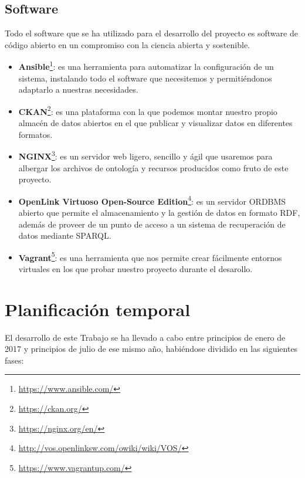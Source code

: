 \subsection{Software}

Todo el software que se ha utilizado para el desarrollo del proyecto es software de código abierto en un compromiso con la ciencia abierta y sostenible.

\begin{itemize}
	\item \textbf{Ansible}\footnote{\url {https://www.ansible.com/}}: es una herramienta para automatizar la configuración de un sistema, instalando todo el software que necesitemos y permitiéndonos adaptarlo a nuestras necesidades.
	\item \textbf{CKAN}\footnote{\url {https://ckan.org/}}: es una plataforma con la que podemos montar nuestro propio almacén de datos abiertos en el que publicar y visualizar datos en diferentes formatos.
	\item \textbf{NGINX}\footnote{\url {https://nginx.org/en/}}: es un servidor web ligero, sencillo y ágil que usaremos para albergar los archivos de ontología y recursos producidos como fruto de este proyecto.
	\item \textbf{OpenLink Virtuoso Open-Source Edition}\footnote{\url {http://vos.openlinksw.com/owiki/wiki/VOS/}}: es un servidor ORDBMS abierto que permite el almacenamiento y la gestión de datos en formato RDF, además de proveer de un punto de acceso a un sistema de recuperación de datos mediante SPARQL.
	\item \textbf{Vagrant}\footnote{\url {https://www.vagrantup.com/}}: es una herramienta que nos permite crear fácilmente entornos virtuales en los que probar nuestro proyecto durante el desarollo. 	
\end{itemize}

\section{Planificación temporal}

El desarrollo de este {\sf Trabajo} se ha llevado a cabo entre principios de enero de 2017 y principios de julio de ese mismo año, habiéndose dividido en las siguientes fases:

